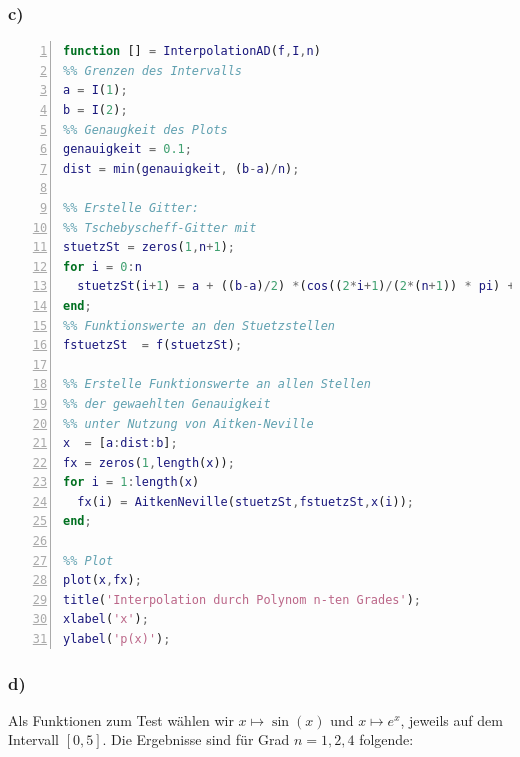 \documentclass[11pt,a4paper,ngerman]{article}
\begin{document}
\subsubsection*{c)}
\begin{lstlisting}[language=matlab,numbers=left]
function [] = InterpolationAD(f,I,n)
%% Grenzen des Intervalls
a = I(1);
b = I(2);
%% Genaugkeit des Plots
genauigkeit = 0.1;
dist = min(genauigkeit, (b-a)/n);

%% Erstelle Gitter:
%% Tschebyscheff-Gitter mit 
stuetzSt = zeros(1,n+1);
for i = 0:n
  stuetzSt(i+1) = a + ((b-a)/2) *(cos((2*i+1)/(2*(n+1)) * pi) + 1);
end;
%% Funktionswerte an den Stuetzstellen
fstuetzSt  = f(stuetzSt);

%% Erstelle Funktionswerte an allen Stellen
%% der gewaehlten Genauigkeit
%% unter Nutzung von Aitken-Neville
x  = [a:dist:b];
fx = zeros(1,length(x));
for i = 1:length(x)
  fx(i) = AitkenNeville(stuetzSt,fstuetzSt,x(i));
end;

%% Plot
plot(x,fx);
title('Interpolation durch Polynom n-ten Grades');
xlabel('x');
ylabel('p(x)');
\end{lstlisting}

\newpage
\subsubsection*{d)}
Als Funktionen zum Test wählen wir $x \mapsto \sin(x)$ und $x \mapsto e^x$, jeweils auf dem Intervall $[0,5]$.
Die Ergebnisse sind für Grad $n = 1,2,4$ folgende:  \\
\end{document}
